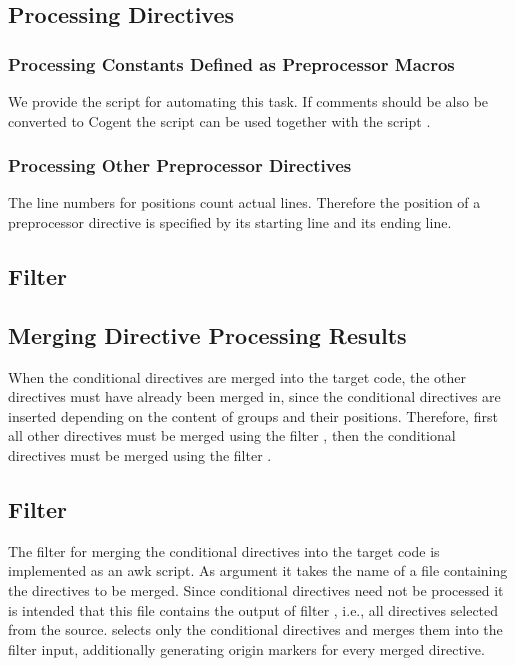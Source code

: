 \subsection{Processing Directives}

\subsubsection{Processing Constants Defined as Preprocessor Macros}

We provide the script  for automating this task. If comments should be also be converted to Cogent 
the script can be used together with the script .

\subsubsection{Processing Other Preprocessor Directives}

The line numbers for positions count actual lines. Therefore the position of a preprocessor directive is specified by its starting line and its ending line. 

\subsection{Filter }

\subsection{Merging Directive Processing Results}

When the conditional directives are merged into the target code, the other 
directives must have already been merged in, since the conditional directives are inserted depending on the content 
of groups and their positions. Therefore, first all other directives must be merged using the filter ,
then the conditional directives must be merged using the filter .

\subsection{Filter }

The filter for merging the conditional directives into the target code is implemented as an awk script. As argument
it takes the name of a file containing the directives to be merged. Since conditional directives need not be
processed it is intended that this file contains the output of filter , i.e., all directives
selected from the source.  selects only the conditional directives and merges them into
the filter input, additionally generating origin markers for every merged directive. 

